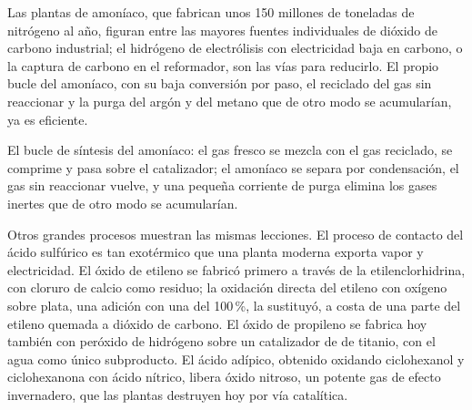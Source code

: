 Las plantas de amoníaco, que fabrican unos 150 millones de toneladas de nitrógeno al año, figuran entre
las mayores fuentes individuales de dióxido de carbono industrial; el hidrógeno de
electrólisis con electricidad baja en carbono, o la captura de carbono en el reformador,
son las vías para reducirlo. El propio bucle del amoníaco, con su baja conversión
por paso, el reciclado del gas sin reaccionar y la purga del argón y del metano que
de otro modo se acumularían, ya es eficiente.

\begin{omfigure}

{\small El bucle de síntesis del amoníaco: el gas fresco se mezcla con el gas reciclado,
se comprime y pasa sobre el catalizador; el amoníaco se separa por condensación, el gas
sin reaccionar vuelve, y una pequeña corriente de purga elimina los gases inertes que de
otro modo se acumularían.}
\end{omfigure}

Otros grandes procesos muestran las mismas lecciones. El proceso de contacto del ácido
sulfúrico es tan exotérmico que una planta moderna exporta vapor y electricidad.
El óxido de etileno se fabricó primero a través de la etilenclorhidrina, con cloruro de
calcio como residuo; la oxidación directa del etileno con oxígeno sobre plata, una
adición con una  del 100\,\%, la sustituyó, a costa de una parte del etileno quemada a
dióxido de carbono. El óxido de propileno se fabrica hoy también con peróxido de hidrógeno sobre un
catalizador de  de titanio, con el agua como único subproducto. El ácido adípico,
obtenido oxidando ciclohexanol y ciclohexanona con ácido nítrico, libera
óxido nitroso, un potente gas de efecto invernadero, que las plantas destruyen hoy por vía catalítica.

